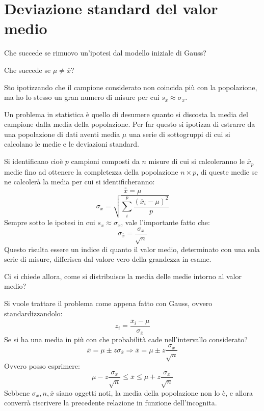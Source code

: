 \documentclass[a4paper, 15pt]{article}
\begin{document}
\section{Deviazione standard del valor medio}
\begin{adjustwidth}{2in}{}	
	Che succede se rimuovo un'ipotesi dal modello iniziale di Gauss? 
	
	Che succede se $\mu\ne\overline{x}$?\newline 
	
	Sto ipotizzando che il campione considerato non coincida più con la popolazione, ma ho lo stesso un gran numero di misure per cui $s_x\approx\sigma_x$.\newline 
	
	Un problema in statistica è quello di desumere quanto si discosta la media del campione dalla media della popolazione. Per far questo si ipotizza di estrarre da una popolazione di dati aventi media $\mu$ una serie di sottogruppi di cui si calcolano le medie e le deviazioni standard. \newline
	
	Si identificano cioè $p$ campioni composti da $n$ misure di cui si calcoleranno le $\overline{x}_p$ medie fino ad ottenere la completezza della popolazione $n\times p$, di queste medie se ne calcolerà la media per cui si identificheranno:
	\[\overline{\overline{x}} = \mu\]
	\[\sigma_{\overline{x}} = \sqrt{\sum_{i}^{p}\dfrac{(\overline{x}_i -\mu)^2}{p}}\]
	Sempre sotto le ipotesi in cui $s_x\approx\sigma_x$, vale l'importante fatto che:
	\[ \sigma_{\overline{x}} =  \dfrac{\sigma_x}{\sqrt{n}}\]
	Questo risulta essere un indice di quanto il valor medio, determinato con una sola serie di misure, differisca dal valore vero della grandezza in esame.\newline
	
	Ci si chiede allora, come si distribuisce la media delle medie intorno al valor medio? \newline
	
	Si vuole trattare il problema come appena fatto con Gauss, ovvero standardizzandolo:
	\[z_i = \dfrac{\overline{x}_i - \mu}{\sigma_{\overline{x}}}\]
	Se si ha una media in più con che probabilità cade nell'intervallo considerato? 
	\[\overline{x} = \mu \pm z\sigma_{\overline{x}} \Rightarrow\overline{x} = \mu \pm z\dfrac{\sigma_x}{\sqrt{n}}\]
	Ovvero posso esprimere:
	\[\mu - z\dfrac{\sigma_x}{\sqrt{n}} \leq \overline{x}\leq \mu + z\dfrac{\sigma_x}{\sqrt{n}} \]
	Sebbene $\sigma_x, n, \overline{x}$ siano oggetti noti, la media della popolazione non lo è, e allora converrà riscrivere la precedente relazione in funzione dell'incognita.\newline
	

\end{adjustwidth}
\end{document}

